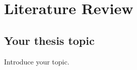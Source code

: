 \chapter[Literature review]{Literature Review}
\label{Chap:lit-review}


\section{Your thesis topic}

Introduce your topic.

